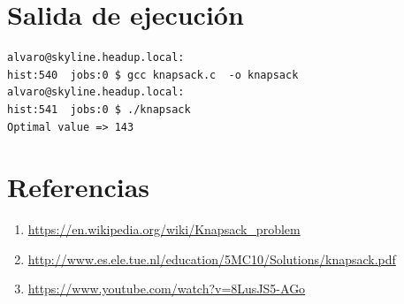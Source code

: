 \documentclass{article}
\begin{document}
\vspace{10mm}
\section{Salida de ejecución}
\begin{framed}
\begin{lstlisting}
alvaro@skyline.headup.local:
hist:540  jobs:0 $ gcc knapsack.c  -o knapsack
alvaro@skyline.headup.local:
hist:541  jobs:0 $ ./knapsack 
Optimal value => 143
\end{lstlisting}
\end{framed}

\vspace{10mm}
\section{Referencias}

\begin{enumerate}
  \item \href{https://en.wikipedia.org/wiki/Knapsack_problem}{https://en.wikipedia.org/wiki/Knapsack\_problem} 
  \item \href{http://www.es.ele.tue.nl/education/5MC10/Solutions/knapsack.pdf}{http://www.es.ele.tue.nl/education/5MC10/Solutions/knapsack.pdf} 
  \item \href{https://www.youtube.com/watch?v=8LusJS5-AGo}{https://www.youtube.com/watch?v=8LusJS5-AGo} 
\end{enumerate}
\end{document}
